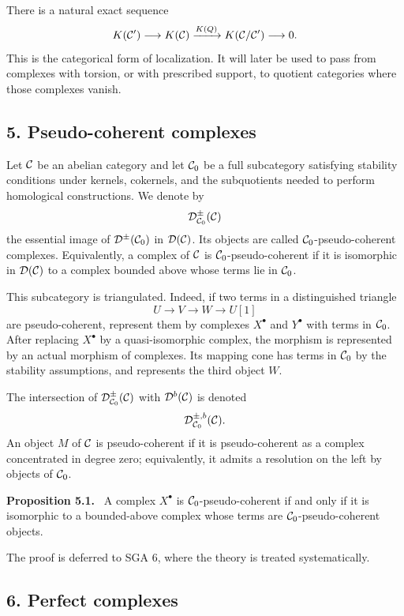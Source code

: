 \documentclass[11pt]{article}
\theoremstyle{plain}
\theoremstyle{definition}
\theoremstyle{remark}
\newenvironment{statement}[1]{\par\medskip\noindent\textbf{#1.}\ }{\par\medskip}
\newcommand{\D}{\mathcal D}\newcommand{\E}{\mathcal E}\newcommand{\F}{\mathcal F}
\begin{document}
There is a natural exact sequence
\[
   K(\mathcal C')\longrightarrow K(\mathcal C)\xrightarrow{K(Q)}K(\mathcal C/\mathcal C')\longrightarrow0.
\]
This is the categorical form of localization. It will later be used to pass from complexes with torsion, or with prescribed support, to quotient categories where those complexes vanish.

\subsection*{5. Pseudo-coherent complexes}

Let $\mathcal C$ be an abelian category and let $\mathcal C_0$ be a full subcategory satisfying stability conditions under kernels, cokernels, and the subquotients needed to perform homological constructions. We denote by
\[
   \D^\pm_{\cC_0}(\cC)
\]
the essential image of $\D^\pm(\cC_0)$ in $\D(\cC)$. Its objects are called $\mathcal C_0$-pseudo-coherent complexes. Equivalently, a complex of $\mathcal C$ is $\mathcal C_0$-pseudo-coherent if it is isomorphic in $\D(\cC)$ to a complex bounded above whose terms lie in $\mathcal C_0$.

This subcategory is triangulated. Indeed, if two terms in a distinguished triangle
\[
   U\to V\to W\to U[1]
\]
are pseudo-coherent, represent them by complexes $X^\bullet$ and $Y^\bullet$ with terms in $\mathcal C_0$. After replacing $X^\bullet$ by a quasi-isomorphic complex, the morphism is represented by an actual morphism of complexes. Its mapping cone has terms in $\mathcal C_0$ by the stability assumptions, and represents the third object $W$.

The intersection of $\D^\pm_{\cC_0}(\cC)$ with $\D^b(\cC)$ is denoted
\[
   \D^{\pm,b}_{\cC_0}(\cC).
\]
An object $M$ of $\mathcal C$ is pseudo-coherent if it is pseudo-coherent as a complex concentrated in degree zero; equivalently, it admits a resolution on the left by objects of $\mathcal C_0$.

\begin{statement}{Proposition 5.1}
A complex $X^\bullet$ is $\mathcal C_0$-pseudo-coherent if and only if it is isomorphic to a bounded-above complex whose terms are $\mathcal C_0$-pseudo-coherent objects.
\end{statement}

The proof is deferred to SGA 6, where the theory is treated systematically.

\subsection*{6. Perfect complexes}
\end{document}
